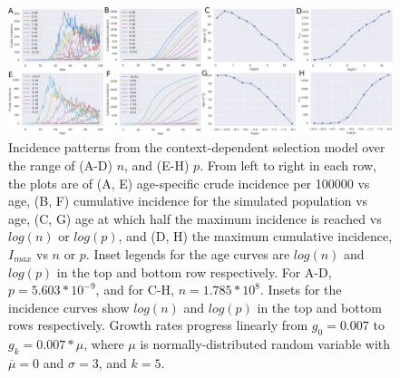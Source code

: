\documentclass[9pt,twocolumn,twoside]{pnas-new}
\begin{document}
\begin{figure}[tbhp]
	\centering
	\includegraphics[width=.8\linewidth]{fig4.png}
	\caption{Incidence patterns from the context-dependent selection model over the range of (A-D) $n$, and (E-H) $p$. From left to right in each row, the plots are of (A, E) age-specific crude incidence per 100000 vs age, (B, F) cumulative incidence for the simulated population vs age, (C, G) age at which half the maximum incidence is reached vs $log(n)$ or $log(p)$, and (D, H) the maximum cumulative incidence, $I_{max}$ vs $n$ or $p$. Inset legends for the age curves are $log(n)$ and $log(p)$ in the top and bottom row respectively. For A-D, $p=5.603*10^{-9}$, and for C-H, $n=1.785*10^{8}$. Insets for the incidence curves show $log(n)$ and $log(p)$ in the top and bottom rows respectively. Growth rates progress linearly from $g_{0}=0.007$ to $g_{k}=0.007*\mu$, where $\mu$ is normally-distributed random variable with $\overline{\mu}=0$ and $\sigma=3$, and $k=5$.}
	\label{fig4}
\end{figure}
\end{document}
